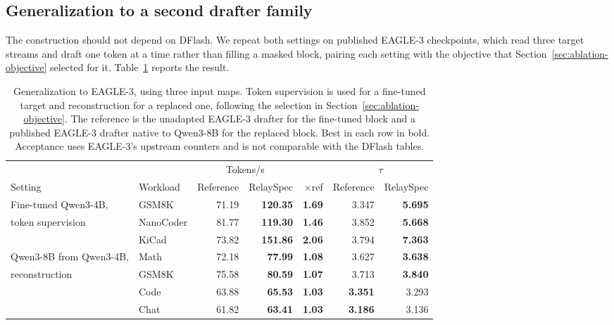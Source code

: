 \subsection{Generalization to a second drafter family}
\label{sec:eagle}
The construction should not depend on DFlash. We repeat both settings on published EAGLE-3 checkpoints, which read three target streams and draft one token at a time rather than filling a masked block, pairing each setting with the objective that Section~\ref{sec:ablation-objective} selected for it. Table~\ref{tab:eagle} reports the result.

\begin{table}[t]
\centering
\caption{Generalization to EAGLE-3, using three input maps. Token supervision is used for a fine-tuned target and reconstruction for a replaced one, following the selection in Section~\ref{sec:ablation-objective}. The reference is the unadapted EAGLE-3 drafter for the fine-tuned block and a published EAGLE-3 drafter native to Qwen3-8B for the replaced block. Best in each row in bold. Acceptance uses EAGLE-3's upstream counters and is not comparable with the DFlash tables.}
\label{tab:eagle}
\small
\begin{tabular}{llrrrrr}
\toprule
& & \multicolumn{2}{c}{Tokens/s} & & \multicolumn{2}{c}{$\tau$} \\
\cmidrule(lr){3-4}\cmidrule(lr){6-7}
Setting & Workload & Reference & RelaySpec & $\times$ref & Reference & RelaySpec \\
\midrule
Fine-tuned Qwen3-4B, & GSM8K & 71.19 & \textbf{120.35} & \textbf{1.69} & 3.347 & \textbf{5.695} \\
token supervision & NanoCoder & 81.77 & \textbf{119.30} & \textbf{1.46} & 3.852 & \textbf{5.668} \\
 & KiCad & 73.82 & \textbf{151.86} & \textbf{2.06} & 3.794 & \textbf{7.363} \\
\midrule
Qwen3-8B from Qwen3-4B, & Math & 72.18 & \textbf{77.99} & \textbf{1.08} & 3.627 & \textbf{3.638} \\
reconstruction & GSM8K & 75.58 & \textbf{80.59} & \textbf{1.07} & 3.713 & \textbf{3.840} \\
 & Code & 63.88 & \textbf{65.53} & \textbf{1.03} & \textbf{3.351} & 3.293 \\
 & Chat & 61.82 & \textbf{63.41} & \textbf{1.03} & \textbf{3.186} & 3.136 \\
\bottomrule
\end{tabular}
\end{table}

